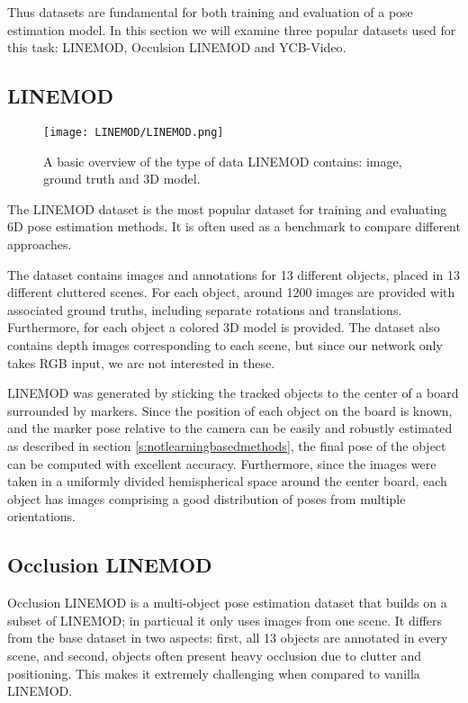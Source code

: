 Thus datasets are fundamental for both training and evaluation of a pose estimation model. In this section we will examine three popular datasets used for this task: LINEMOD\cite{linemod}, Occulsion LINEMOD\cite{occlusionlinemod} and YCB-Video\cite{PoseCNN}.

\subsection{LINEMOD}
\label{ss:LINEMOD}

\begin{figure}[ht]
    \centering
    \texttt{[image: LINEMOD/LINEMOD.png]}
    \caption{A basic overview of the type of data LINEMOD contains: image, ground truth and 3D model.}
    \label{fig:linemod}
\end{figure}

The LINEMOD\cite{linemod} dataset is the most popular dataset for training and evaluating 6D pose estimation methods. It is often used as a benchmark to compare different approaches.

The dataset contains images and annotations for 13 different objects, placed in 13 different cluttered scenes. For each object, around 1200 images are provided with associated ground truths, including separate rotations and translations. Furthermore, for each object a colored 3D model is provided. The dataset also contains depth images corresponding to each scene, but since our network only takes RGB input, we are not interested in these.

LINEMOD was generated by sticking the tracked objects to the center of a board surrounded by markers. Since the position of each object on the board is known, and the marker pose relative to the camera can be easily and robustly estimated as described in section \ref{s:notlearningbasedmethods}, the final pose of the object can be computed with excellent accuracy. Furthermore, since the images were taken in a uniformly divided hemispherical space around the center board, each object has images comprising a good distribution of poses from multiple orientations.

\subsection{Occlusion LINEMOD}

Occlusion LINEMOD\cite{occlusionlinemod} is a multi-object pose estimation dataset that builds on a subset of LINEMOD; in particual it only uses images from one scene. It differs from the base dataset in two aspects: first, all 13 objects are annotated in every scene, and second, objects often present heavy occlusion due to clutter and positioning. This makes it extremely challenging when compared to vanilla LINEMOD.

